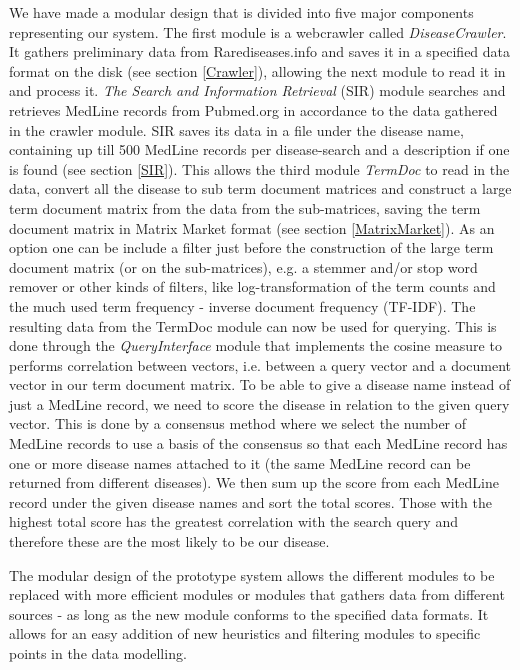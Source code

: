 We have made a modular design that is divided into five major
components representing our system. The first module is a webcrawler
called \textit{DiseaseCrawler}. It gathers preliminary data from
Rarediseases.info and saves it in a specified data format on the disk
(see section \ref{Crawler}), allowing the next module to read it in
and process it. \textit{The Search and Information Retrieval} (SIR)
module searches and retrieves MedLine records from Pubmed.org in
accordance to the data gathered in the crawler module. SIR saves its
data in a file under the disease name, containing up till 500 MedLine
records per disease-search and a description if one is found (see
section \ref{SIR}). This allows the third module \textit{TermDoc} to
read in the data, convert all the disease to sub term document
matrices and construct a large term document matrix from the data from
the sub-matrices, saving the term document matrix in Matrix Market
format (see section \ref{MatrixMarket}). As an option one can be include a filter
just before the construction of the large term document matrix (or on
the sub-matrices), e.g. a stemmer and/or stop word remover or other
kinds of filters, like log-transformation of the term counts and the
much used term frequency - inverse document frequency (TF-IDF). The
resulting data from the TermDoc module can now be used for
querying. This is done through the \textit{QueryInterface} module that
implements the cosine measure to performs correlation between vectors,
i.e. between a query vector and a document vector in our term document
matrix. To be able to give a disease name instead of just a MedLine
record, we need to score the disease in relation to the given query
vector. This is done by a consensus method where we select the number
of MedLine records to use a basis of the consensus so that each
MedLine record has one or more disease names attached to it (the same
MedLine record can be returned from different diseases). We then sum
up the score from each MedLine record under the given disease names
and sort the total scores. Those with the highest total score has the
greatest correlation with the search query and therefore these are the
most likely to be our disease.

The modular design of the prototype system allows the different
modules to be replaced with more efficient modules or modules that
gathers data from different sources - as long as the new module
conforms to the specified data formats. It allows for an easy addition
of new heuristics and filtering modules to specific points in the data
modelling.

